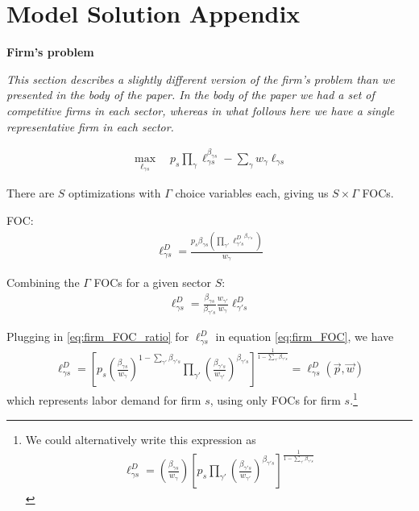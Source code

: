 \documentclass[12pt]{article}
\def\g{\gamma}
\theoremstyle{definition}
\theoremstyle{plain}
\begin{document}
\clearpage

\section{Model Solution Appendix}



\textbf{Firm's problem}


\emph{This section describes a slightly different version of the firm's problem than we presented in the body of the paper. In the body of the paper we had a set of competitive firms in each sector, whereas in what follows here we have a single representative firm in each sector. }

\begin{align}
\max_{\ell_{\g s}} \quad p_s \prod_{\g} \ell_{\g s}^{\beta_{\g s}} - \sum_{\g} w_{\g} \ell_{\g s}
\end{align}

There are $S$ optimizations with $\Gamma$ choice variables each, giving us $S \times \Gamma$ FOCs.

FOC:
\begin{align}
\ell_{\g s}^D = \frac{p_s \beta_{\g s}\left( \prod_{\g'} {\ell_{\g' s}^D}^{\beta_{\g' s}}\right)}{w_{\g}} \label{eq:firm_FOC}
\end{align}

Combining the $\Gamma$ FOCs for a given sector $S$:
\begin{align}
\ell_{\g s}^D = \frac{\beta_{\g s}}{\beta_{\g' s}}\frac{w_{\g'}}{w_{\g}} \ell_{\g's}^D \label{eq:firm_FOC_ratio}
\end{align}

Plugging in \ref{eq:firm_FOC_ratio} for $\ell_{\g s}^D$ in equation \ref{eq:firm_FOC}, we have
\begin{align}
\ell_{\g s}^D = \left[ p_s \left( \frac{\beta_{\g s}}{w_{\g }} \right)^{1-\sum_{\g'} \beta_{\g' s}} \prod_{\g'} \left(\frac{\beta_{\g' s}}{w_{\g'}} \right)^{\beta_{\g' s}} \right]^{\frac{1}{1-\sum_{\g'} \beta_{\g' s}}} = \ell_{\g s}^D \left(\vec{p}, \vec{w} \right) \label{eq:labor_demand}
\end{align}
which represents labor demand for firm $s$, using only FOCs for firm $s$.\footnote{We could alternatively write this expression as 
	\begin{align*}
	\ell_{\g s}^D =   \left( \frac{\beta_{\g s}}{w_{\g }} \right) \left[ p_s \prod_{\g'}  \left(\frac{\beta_{\g' s}}{w_{\g'}} \right)^{\beta_{\g' s}} \right]^{\frac{1}{1-\sum_{\g'} \beta_{\g' s}}}
	\end{align*}
	}
\end{document}
